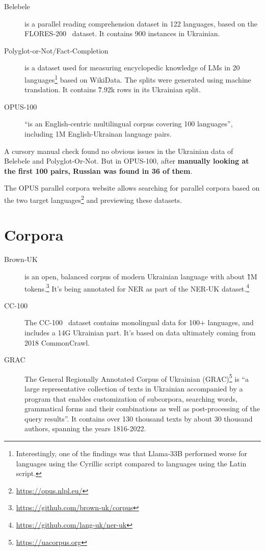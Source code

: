 
\begin{description}
\item[Belebele~\cite{bandarkar_belebele_2023}] is a parallel reading comprehension dataset in 122 languages, based on the FLORES-200~\cite{nllb-22} dataset. It contains 900 instances in Ukrainian.
\item[Polyglot-or-Not/Fact-Completion~\cite{schott_polyglot_2023}] is a dataset used for measuring encyclopedic knowledge of LMs in 20 languages\footnote{Interestingly, one of the findings was that Llama-33B performed worse for languages using the Cyrillic script compared to languages using the Latin script.} based on WikiData. The splits were generated using machine translation. It contains \~7.92k rows in its Ukrainian split.
\item[OPUS-100~\cite{zhang_improving_2020}] \enquote{is an English-centric multilingual corpus covering 100 languages}, including 1M English-Ukrainan language pairs. 
\end{description}
A cursory manual check found no obvious issues in the Ukrainian data of Belebele and Polyglot-Or-Not. But in OPUS-100, after \textbf{manually looking at the first 100 pairs, Russian was found in 36 of them}.

The OPUS parallel corpora website allows searching for parallel corpora based on the two target languages\footnote{\href{https://opus.nlpl.eu/}{https://opus.nlpl.eu/}} and previewing these datasets.

\section{Corpora}
\label{sec:corpora}
\begin{description}
\item[Brown-UK] is an open, balanced corpus of modern Ukrainian language with about \~1M
tokens.\footnote{\href{https://github.com/brown-uk/corpus}{https://github.com/brown-uk/corpus}} 
It's being annotated for NER as part of the 
NER-UK dataset.\footnote{\href{https://github.com/lang-uk/ner-uk}{https://github.com/lang-uk/ner-uk}}
\item[CC-100] The CC-100~\cite{conneau-etal-2020-unsupervised} dataset contains monolingual data for 100+ languages, and includes a 14G Ukrainian part. It's based on data ultimately coming from 2018 CommonCrawl.
\item[GRAC~\cite{shvedova2017grac}] The General Regionally Annotated Corpus of Ukrainian (GRAC)\footnote{\href{https://uacorpus.org/Kyiv/en}{https://uacorpus.org}} is \enquote{a large representative collection of texts in Ukrainian accompanied by a program that enables customization of subcorpora, searching words, grammatical forms and their combinations as well as post-processing of the query results}. It contains over 130 thousand texts by about 30 thousand authors, spanning 
the years 1816-2022.
\end{description}

